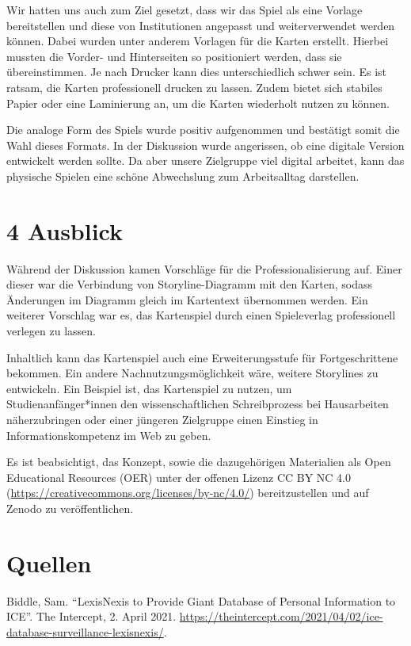 \documentclass[a4paper,
fontsize=11pt,
oneside,
numbers=noperiodatend,
parskip=half-,
bibliography=totoc,
final
]{scrartcl}
\begin{document}
Wir hatten uns auch zum Ziel gesetzt, dass wir das Spiel als eine
Vorlage bereitstellen und diese von Institutionen angepasst und
weiterverwendet werden können. Dabei wurden unter anderem Vorlagen für
die Karten erstellt. Hierbei mussten die Vorder- und Hinterseiten so
positioniert werden, dass sie übereinstimmen. Je nach Drucker kann dies
unterschiedlich schwer sein. Es ist ratsam, die Karten professionell
drucken zu lassen. Zudem bietet sich stabiles Papier oder eine
Laminierung an, um die Karten wiederholt nutzen zu können.

Die analoge Form des Spiels wurde positiv aufgenommen und bestätigt
somit die Wahl dieses Formats. In der Diskussion wurde angerissen, ob
eine digitale Version entwickelt werden sollte. Da aber unsere
Zielgruppe viel digital arbeitet, kann das physische Spielen eine schöne
Abwechslung zum Arbeitsalltag darstellen.

\section{4 Ausblick}\label{ausblick}

Während der Diskussion kamen Vorschläge für die Professionalisierung
auf. Einer dieser war die Verbindung von Storyline-Diagramm mit den
Karten, sodass Änderungen im Diagramm gleich im Kartentext übernommen
werden. Ein weiterer Vorschlag war es, das Kartenspiel durch einen
Spieleverlag professionell verlegen zu lassen.

Inhaltlich kann das Kartenspiel auch eine Erweiterungsstufe für
Fortgeschrittene bekommen. Ein andere Nachnutzungsmöglichkeit wäre,
weitere Storylines zu entwickeln. Ein Beispiel ist, das Kartenspiel zu
nutzen, um Studienanfänger*innen den wissenschaftlichen Schreibprozess
bei Hausarbeiten näherzubringen oder einer jüngeren Zielgruppe einen
Einstieg in Informationskompetenz im Web zu geben.

Es ist beabsichtigt, das Konzept, sowie die dazugehörigen Materialien
als Open Educational Resources (OER) unter der offenen Lizenz CC BY NC
4.0 (\url{https://creativecommons.org/licenses/by-nc/4.0/})
bereitzustellen und auf Zenodo zu veröffentlichen.

\section{Quellen}\label{quellen}

Biddle, Sam. \enquote{LexisNexis to Provide Giant Database of Personal
Information to ICE}. The Intercept, 2. April 2021.
\url{https://theintercept.com/2021/04/02/ice-database-surveillance-lexisnexis/}.
\end{document}
